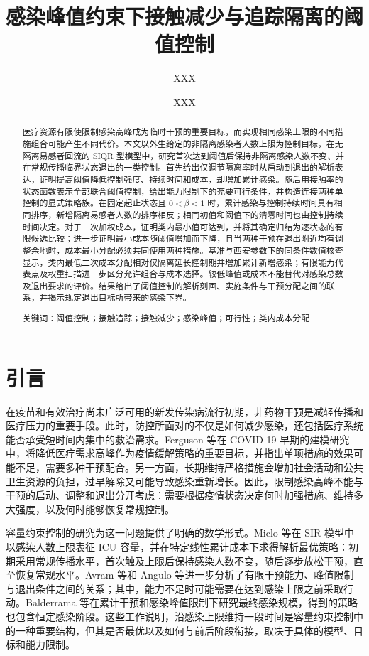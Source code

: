 \documentclass[lang=cn,a4paper,newtx]{elegantpaper}
\title{感染峰值约束下接触减少与追踪隔离的阈值控制}
\author{XXX \and XXX}
\institute{School of Mathematics and Statistics, Shaanxi Normal University}
\date{}
\numberwithin{equation}{section}
\theoremstyle{plain}
\begin{document}
\maketitle
\begin{abstract}
医疗资源有限使限制感染高峰成为临时干预的重要目标，而实现相同感染上限的不同措施组合可能产生不同代价。本文以外生给定的非隔离感染者人数上限为控制目标，在无隔离易感者回流的 SIQR 型模型中，研究首次达到阈值后保持非隔离感染人数不变、并在常规传播临界状态退出的一类控制。首先给出仅调节隔离率时从启动到退出的解析表达，证明提高阈值降低控制强度、持续时间和成本，却增加累计感染。随后用接触率的状态函数表示全部联合阈值控制，给出能力限制下的充要可行条件，并构造连接两种单控制的显式策略族。在固定起止状态且 $0<\beta<1$ 时，累计感染与控制持续时间具有相同排序，新增隔离易感者人数的排序相反；相同初值和阈值下的清零时间也由控制持续时间决定。对于二次加权成本，证明类内最小值可达到，并将其确定归结为逐状态的有限候选比较；进一步证明最小成本随阈值增加而下降，且当两种干预在退出附近均有调整余地时，成本最小分配必须共同使用两种措施。基准与西安参数下的同条件数值核查显示，类内最低二次成本分配相对仅隔离延长控制期并增加累计新增感染；有限能力代表点及权重扫描进一步区分允许组合与成本选择。较低峰值或成本不能替代对感染总数及退出要求的评价。结果给出了阈值控制的解析刻画、实施条件与干预分配之间的联系，并揭示规定退出目标所带来的感染下界。
\par\medskip\noindent 关键词：阈值控制；接触追踪；接触减少；感染峰值；可行性；类内成本分配
\end{abstract}

\section{引言}
\label{sec:introduction}
在疫苗和有效治疗尚未广泛可用的新发传染病流行初期，非药物干预是减轻传播和医疗压力的重要手段。此时，防控所面对的不仅是如何减少感染，还包括医疗系统能否承受短时间内集中的救治需求。Ferguson 等\cite{Ferguson2020Report9}在 COVID-19 早期的建模研究中，将降低医疗需求高峰作为疫情缓解策略的重要目标，并指出单项措施的效果可能不足，需要多种干预配合。另一方面，长期维持严格措施会增加社会活动和公共卫生资源的负担，过早解除又可能导致感染重新增长\cite{Duque2020}。因此，限制感染高峰不能与干预的启动、调整和退出分开考虑：需要根据疫情状态决定何时加强措施、维持多大强度，以及何时能够恢复常规控制。

容量约束控制的研究为这一问题提供了明确的数学形式。Miclo 等\cite{Miclo2022ICU}在 SIR 模型中以感染人数上限表征 ICU 容量，并在特定线性累计成本下求得解析最优策略：初期采用常规传播水平，首次触及上限后保持感染人数不变，随后逐步放松干预，直至恢复常规水平。Avram 等\cite{Avram2022}和 Angulo 等\cite{Angulo2021}进一步分析了有限干预能力、峰值限制与退出条件之间的关系；其中，能力不足时可能需要在达到感染上限之前采取行动。Balderrama 等\cite{Balderrama2024}在累计干预和感染峰值限制下研究最终感染规模，得到的策略也包含恒定感染阶段。这些工作说明，沿感染上限维持一段时间是容量约束控制中的一种重要结构，但其是否最优以及如何与前后阶段衔接，取决于具体的模型、目标和能力限制。
\end{document}
